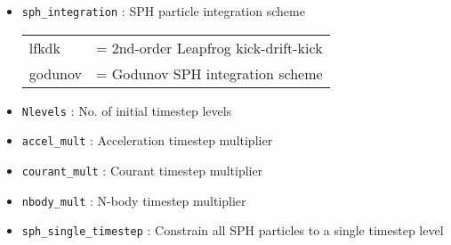 \documentclass[a4paper]{article}
\newcommand{\var}[1]{\texttt{#1}}
\begin{document}
\begin{itemize}

\item \var{sph\_integration} : SPH particle integration scheme \\
\begin{tabular}{ll}
lfkdk   & = 2nd-order Leapfrog kick-drift-kick \\
godunov & = Godunov SPH integration scheme
\end{tabular}



\item \var{Nlevels} : No. of initial timestep levels

\item \var{accel\_mult} : Acceleration timestep multiplier

\item \var{courant\_mult} : Courant timestep multiplier

\item \var{nbody\_mult} : N-body timestep multiplier

\item \var{sph\_single\_timestep} : Constrain all SPH particles to a single timestep level 


\end{itemize}
\end{document}
